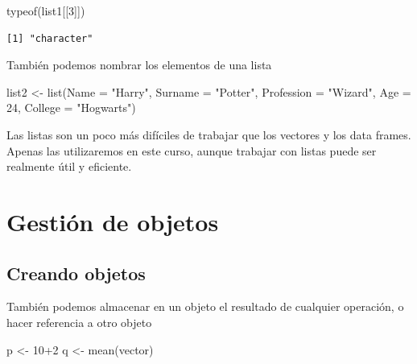 \documentclass[
  letterpaper,
  DIV=11,
  numbers=noendperiod]{scrreprt}
\newenvironment{Shaded}{\begin{snugshade}}{\end{snugshade}}
\newcommand{\AttributeTok}[1]{\textcolor[rgb]{0.40,0.45,0.13}{#1}}
\newcommand{\DecValTok}[1]{\textcolor[rgb]{0.68,0.00,0.00}{#1}}
\newcommand{\FunctionTok}[1]{\textcolor[rgb]{0.28,0.35,0.67}{#1}}
\newcommand{\NormalTok}[1]{\textcolor[rgb]{0.00,0.23,0.31}{#1}}
\newcommand{\OtherTok}[1]{\textcolor[rgb]{0.00,0.23,0.31}{#1}}
\newcommand{\SpecialCharTok}[1]{\textcolor[rgb]{0.37,0.37,0.37}{#1}}
\newcommand{\StringTok}[1]{\textcolor[rgb]{0.13,0.47,0.30}{#1}}
\begin{document}
\begin{Shaded}
\begin{Highlighting}[]
\FunctionTok{typeof}\NormalTok{(list1[[}\DecValTok{3}\NormalTok{]])}
\end{Highlighting}
\end{Shaded}

\begin{verbatim}
[1] "character"
\end{verbatim}

También podemos nombrar los elementos de una lista

\begin{Shaded}
\begin{Highlighting}[]
\NormalTok{list2 }\OtherTok{\textless{}{-}} \FunctionTok{list}\NormalTok{(}\AttributeTok{Name =} \StringTok{"Harry"}\NormalTok{, }\AttributeTok{Surname =} \StringTok{"Potter"}\NormalTok{, }\AttributeTok{Profession =} \StringTok{"Wizard"}\NormalTok{, }\AttributeTok{Age =} \DecValTok{24}\NormalTok{,}
              \AttributeTok{College =} \StringTok{"Hogwarts"}\NormalTok{)}
\end{Highlighting}
\end{Shaded}

Las listas son un poco más difíciles de trabajar que los vectores y los
data frames. Apenas las utilizaremos en este curso, aunque trabajar con
listas puede ser realmente útil y eficiente.

\hypertarget{gestiuxf3n-de-objetos}{%
\section{Gestión de objetos}\label{gestiuxf3n-de-objetos}}

\hypertarget{creando-objetos}{%
\subsection{Creando objetos}\label{creando-objetos}}

También podemos almacenar en un objeto el resultado de cualquier
operación, o hacer referencia a otro objeto

\begin{Shaded}
\begin{Highlighting}[]
\NormalTok{p }\OtherTok{\textless{}{-}} \DecValTok{10}\SpecialCharTok{+}\DecValTok{2}
\NormalTok{q }\OtherTok{\textless{}{-}} \FunctionTok{mean}\NormalTok{(vector)}
\end{Highlighting}
\end{Shaded}
\end{document}
